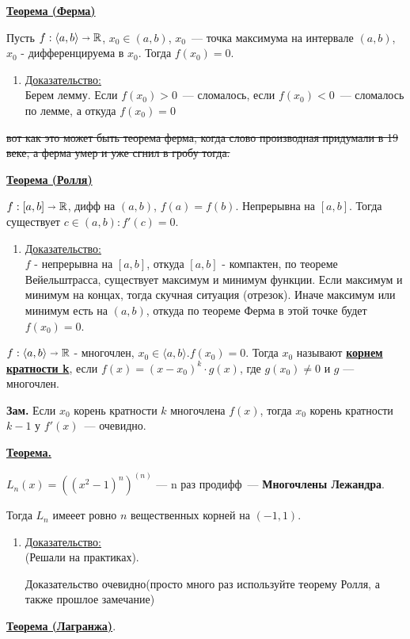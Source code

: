 \documentclass{article}
\newcommand{\deff}[1]{\underline{\textbf{#1}}}
\newcommand{\thmm}[1]{\underline{\textbf{#1}}}
\newcommand{\prooff}[1]{{\underline{Доказательство:}} \\ }
\begin{document}
\thmm{Теорема (Ферма)}

Пусть $f: \langle a,b\rangle \shortrightarrow \mathbb{R}$, $x_0 \in (a,b)$, $x_0$~--- точка максимума на интервале $(a,b)$, $x_0$ - дифференцируема в $x_0$. Тогда $f(x_0) = 0$.

\begin{enumerate}
    \item[] \prooff{}
    Берем лемму. Если $f(x_0) > 0$~--- сломалось, если $f(x_0)<0$~--- сломалось по лемме, а откуда $f(x_0) =0$

\end{enumerate}
\sout{вот как это может быть теорема ферма, когда слово производная придумали в 19 веке, а ферма умер и уже сгнил в гробу тогда.}

\thmm{Теорема (Ролля)} 

$f: [a,b] \shortrightarrow \mathbb{R}$, дифф на $(a,b)$, $f(a) = f(b)$. Непрерывна на $[a,b]$. Тогда существует $c \in (a,b): f'(c)=0$.
\begin{enumerate}
    \item[] \prooff{}
    $f $ - непрерывна на $[a,b]$, откуда $[a,b]$ - компактен, по теореме Вейельштрасса, существует максимум и минимум функции. Если максимум и минимум на концах, тогда скучная ситуация (отрезок). Иначе максимум или минимум есть на $(a,b)$, откуда по теореме Ферма в этой точке будет $f(x_0)=0$.
\end{enumerate}

$f:\langle a,b\rangle \shortrightarrow \mathbb{R}$ - многочлен, $x_0 \in \langle a,b\rangle. f(x_0) =0 $. Тогда $x_0$ называют \deff{корнем кратности k}, если $f(x) = (x-x_0)^k \cdot g(x)$, где $g(x_0) \neq 0$ и $g$ --- многочлен.

\textbf{Зам.} Если $x_0$ корень кратности $k$ многочлена $f(x)$, тогда $x_0$ корень кратности $k-1$ у $f'(x)$~--- очевидно.

\thmm{Теорема.}

$L_n(x) = ((x^2-1)^n)^{(n)}$ --- n раз продифф~--- \textbf{Многочлены Лежандра}.

Тогда $L_n$ имееет ровно $n$ вещественных корней на $(-1,1)$.
\begin{enumerate}
    \item[] \prooff{}
    (Решали на практиках). 
    
    Доказательство очевидно(просто много раз используйте теорему Ролля, а также прошлое замечание)
\end{enumerate}

\thmm{Теорема (Лагранжа)}.
\end{document}
